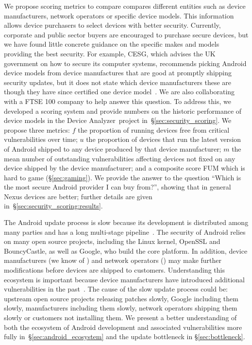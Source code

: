 \documentclass{sig-alternate-2013}
\newcommand{\da}{Device Analyzer}
\begin{document}
We propose scoring metrics to compare compares different entities such as device manufacturers, network operators or specific device models.
This information allows device purchasers to select devices with better security.
Currently, corporate and public sector buyers are encouraged to purchase secure devices, but we have found little concrete guidance on the specific makes and models providing the best security.
For example, CESG, which advises the UK government on how to secure its computer systems, recommends picking Android device models from device manufactures that are good at promptly shipping security updates, but it does not state which device manufacturers these are~\cite{CESG2013} though they have since certified one device model~\cite{CESG2015}.
We are also collaborating with a FTSE 100 company to help answer this question.
To address this, we developed a scoring system and provide numbers on the historic performance of device models in the \da\ project in~\S\ref{sec:security_scoring}.
We propose three metrics:
$f$ the proportion of running devices free from critical vulnerabilities over time;
$u$ the proportion of devices that run the latest version of Android shipped to any device produced by that device manufacturer;
$m$ the mean number of outstanding vulnerabilities affecting devices not fixed on any device shipped by the device manufacturer;
and a composite score FUM which is hard to game (\S\ref{sec:gaming}).
We provide the answer to the question ``Which is the most secure Android provider I can buy from?'', showing that in general Nexus devices are better; further details are given in~\S\ref{sec:security_scoring:results}.

The Android update process is slow because its development is distributed among many parties and has a long multi-stage pipeline~\cite{HTC2013}.
The security of Android relies on many open source projects, including the Li\-nux kernel, Open\-SSL and Bouncy\-Castle, as well as Google, who build the core platform.
In addition, device manufacturers (we know of \daNumManufacturers) and network operators (\daNumOperators) may make further modifications before devices are shipped to customers.
Understanding this ecosystem is important because device manufacturers have introduced additional vulnerabilities in the past~\cite{Grace2012}.
The cause of the slow update process could be: upstream open source projects releasing patches slowly, Google including them slowly, manufacturers including them slowly, network operators shipping them slowly or customers not installing them.
We present a better understanding of both the ecosystem of Android development and associated vulnerabilities more fully in~\S\ref{sec:android_ecosystem} and the update bottleneck in \S\ref{sec:bottleneck}.
\end{document}
